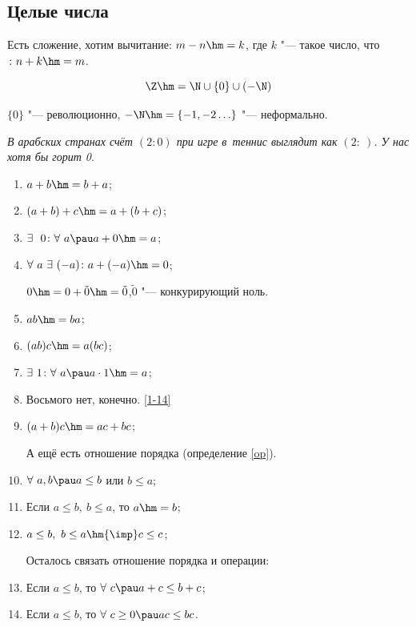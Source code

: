 \documentclass[a4paper,10pt,twoside]{article}
\begin{document}
\subsection{Целые числа}
Есть сложение, хотим вычитание: $m-n\hm=k$, где $k$ "--- такое число, что$\colon n+k\hm=m$.

\[
\Z\hm=\N\cup\{0\}\cup(-\N)
\]

$\{0\}$ "--- революционно, $-\N\hm=\{-1,-2\ldots\}$ "--- неформально.

\textit{В арабских странах счёт $(2:0)$ при игре в~теннис выглядит как $(2:\ )$. У нас хотя бы горит 0}.

\begin{enumerate}
\item \label{Z1}$a+b\hm=b+a$;

\item $(a+b)+c\hm=a+(b+c)$;

\item \label{Z3} $\exists\ \ 0\colon\forall\  a\pau a+0\hm=a$;

\item \label{Z4} $\forall\  a\ \exists\ (-a)\colon a+(-a)\hm=0$;

$0\hm=0+\tilde 0\hm=\tilde 0$,\pau $\tilde 0$ "--- конкурирующий ноль.

\item $ab\hm=ba$;

\item $(ab)c\hm=a(bc)$;

\item $\exists\  1\colon \forall\  a\pau a\cdot1\hm=a$;

\item Восьмого нет, конечно. \ref{1-14}

\item \label{Z9} $(a+b)c\hm=ac+bc$;

А ещё есть отношение порядка (определение \ref{op}).

\item $\forall\  a,b\pau a\leq b$ или $b\leq a$;

\item Если $a\leq b,\ b\leq a$, то $a\hm=b$;

\item $a\leq b,\ b\leq a\hm{\imp} c\leq c$;

Осталось связать отношение порядка и операции:

\item Если $a\leq b$, то $\forall\  c\pau a+c\leq b+c$;

\item Если $a\leq b$, то $\forall\  c\geq0\pau ac\leq bc$.
\end{enumerate}
\end{document}
